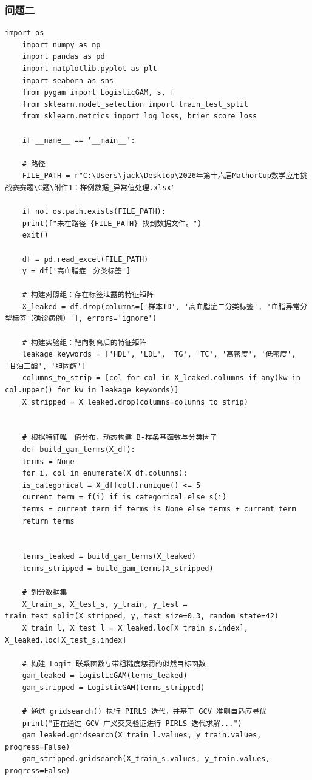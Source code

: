 \documentclass[12pt]{article}
\begin{document}
\subsubsection{问题二} 

\begin{lstlisting}[caption={GAM靶向剥离标签泄露高血脂风险预测}, label={code:gam_leakage_stripping}]
	import os
	import numpy as np
	import pandas as pd
	import matplotlib.pyplot as plt
	import seaborn as sns
	from pygam import LogisticGAM, s, f
	from sklearn.model_selection import train_test_split
	from sklearn.metrics import log_loss, brier_score_loss
	
	if __name__ == '__main__':
	
	# 路径
	FILE_PATH = r"C:\Users\jack\Desktop\2026年第十六届MathorCup数学应用挑战赛赛题\C题\附件1：样例数据_异常值处理.xlsx"
	
	if not os.path.exists(FILE_PATH):
	print(f"未在路径 {FILE_PATH} 找到数据文件。")
	exit()
	
	df = pd.read_excel(FILE_PATH)
	y = df['高血脂症二分类标签']
	
	# 构建对照组：存在标签泄露的特征矩阵
	X_leaked = df.drop(columns=['样本ID', '高血脂症二分类标签', '血脂异常分型标签（确诊病例）'], errors='ignore')
	
	# 构建实验组：靶向剥离后的特征矩阵
	leakage_keywords = ['HDL', 'LDL', 'TG', 'TC', '高密度', '低密度', '甘油三酯', '胆固醇']
	columns_to_strip = [col for col in X_leaked.columns if any(kw in col.upper() for kw in leakage_keywords)]
	X_stripped = X_leaked.drop(columns=columns_to_strip)
	
	
	# 根据特征唯一值分布，动态构建 B-样条基函数与分类因子
	def build_gam_terms(X_df):
	terms = None
	for i, col in enumerate(X_df.columns):
	is_categorical = X_df[col].nunique() <= 5
	current_term = f(i) if is_categorical else s(i)
	terms = current_term if terms is None else terms + current_term
	return terms
	
	
	terms_leaked = build_gam_terms(X_leaked)
	terms_stripped = build_gam_terms(X_stripped)
	
	# 划分数据集
	X_train_s, X_test_s, y_train, y_test = train_test_split(X_stripped, y, test_size=0.3, random_state=42)
	X_train_l, X_test_l = X_leaked.loc[X_train_s.index], X_leaked.loc[X_test_s.index]
	
	# 构建 Logit 联系函数与带粗糙度惩罚的似然目标函数
	gam_leaked = LogisticGAM(terms_leaked)
	gam_stripped = LogisticGAM(terms_stripped)
	
	# 通过 gridsearch() 执行 PIRLS 迭代，并基于 GCV 准则自适应寻优
	print("正在通过 GCV 广义交叉验证进行 PIRLS 迭代求解...")
	gam_leaked.gridsearch(X_train_l.values, y_train.values, progress=False)
	gam_stripped.gridsearch(X_train_s.values, y_train.values, progress=False)
	

\end{lstlisting}
\end{document}

